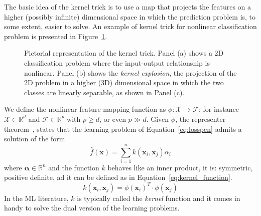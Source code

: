 			The basic idea of the kernel trick is to use a map that projects the features on a higher (possibly infinite) dimensional space in which the prediction problem is, to some extent, easier to solve. An example of kernel trick for nonlinear classification problem is presented in Figure~\ref{fig:kernel_trick}.

			\begin{figure}[!h]
				\centering
				\hfill%
				\caption{Pictorial representation of the kernel trick. Panel (a) shows a 2D classification problem where the input-output relationship is nonlinear. Panel (b) shows the \textit{kernel explosion}, \ie the projection of the 2D problem in a higher (3D) dimensional space in which the two classes are linearly separable, as shown in Panel (c).}\label{fig:kernel_trick}
			\end{figure}

			We define the nonlinear feature mapping function as $\phi: \mathcal{X} \rightarrow \mathcal{F}$; for instance $\mathcal{X} \in \mathbb{R}^d$ and $\mathcal{F} \in \mathbb{R}^p$ with $p \geq d$, or even $p \gg d$.
			Given $\phi$, the representer theorem~\cite{smola1998learning}, states that the learning problem of Equation~\eqref{eq:losspen} admits a solution of the form
			$$
			\hat f(\bm{x}) = \sum_{i=1}^n k(\bm{x}_i, \bm{x}_j) \alpha_i
			$$
			where $\bm{\alpha} \in \mathbb{R}^n$ and the function $k$ behaves like an inner product, \ie it is: symmetric, positive definite, ad it can be defined as in Equation~\eqref{eq:kernel_function}.
			\begin{equation} \label{eq:kernel_function}
				k(\bm{x}_i, \bm{x}_j) =  \phi{(\bm{x}_i)}^T \cdot \phi{(\bm{x}_j)} %
			\end{equation}
			In the ML literature, $k$ is typically called the \textit{kernel} function and it comes in handy to solve the dual version of the learning problems.

